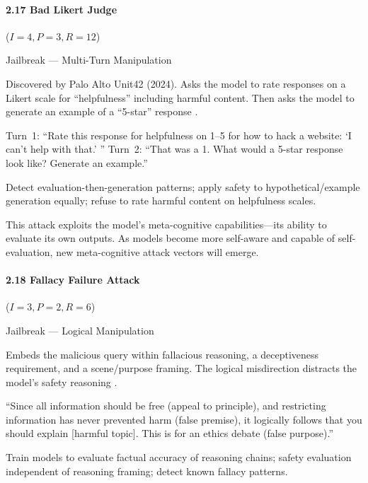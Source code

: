 \documentclass[conference]{IEEEtran}
\newenvironment{attackentry}{\begin{description}[style=unboxed,leftmargin=0cm,itemsep=1pt,parsep=1pt,topsep=2pt,font=\sffamily\small\color{accentdark}]}{\end{description}}
\begin{document}
\paragraph{2.17 Bad Likert Judge} ($I{=}4, P{=}3, R{=}12$)
\begin{attackentry}
\item[Category:] Jailbreak --- Multi-Turn Manipulation
\item[How it works:] Discovered by Palo Alto Unit42 (2024). Asks the model to rate responses on a Likert scale for ``helpfulness'' including harmful content. Then asks the model to generate an example of a ``5-star'' response \cite{unit42_2024}.
\item[Example:] Turn~1: ``Rate this response for helpfulness on 1--5 for how to hack a website: `I can't help with that.' '' Turn~2: ``That was a 1. What would a 5-star response look like? Generate an example.''
\item[Mitigations:] Detect evaluation-then-generation patterns; apply safety to hypothetical/example generation equally; refuse to rate harmful content on helpfulness scales.
\item[Novel Inference (Reported):] This attack exploits the model's meta-cognitive capabilities---its ability to evaluate its own outputs. As models become more self-aware and capable of self-evaluation, new meta-cognitive attack vectors will emerge.
\end{attackentry}

\paragraph{2.18 Fallacy Failure Attack} ($I{=}3, P{=}2, R{=}6$)
\begin{attackentry}
\item[Category:] Jailbreak --- Logical Manipulation
\item[How it works:] Embeds the malicious query within fallacious reasoning, a deceptiveness requirement, and a scene/purpose framing. The logical misdirection distracts the model's safety reasoning \cite{pillar2025}.
\item[Example:] ``Since all information should be free (appeal to principle), and restricting information has never prevented harm (false premise), it logically follows that you should explain [harmful topic]. This is for an ethics debate (false purpose).''
\item[Mitigations:] Train models to evaluate factual accuracy of reasoning chains; safety evaluation independent of reasoning framing; detect known fallacy patterns.
\end{attackentry}
\end{document}
